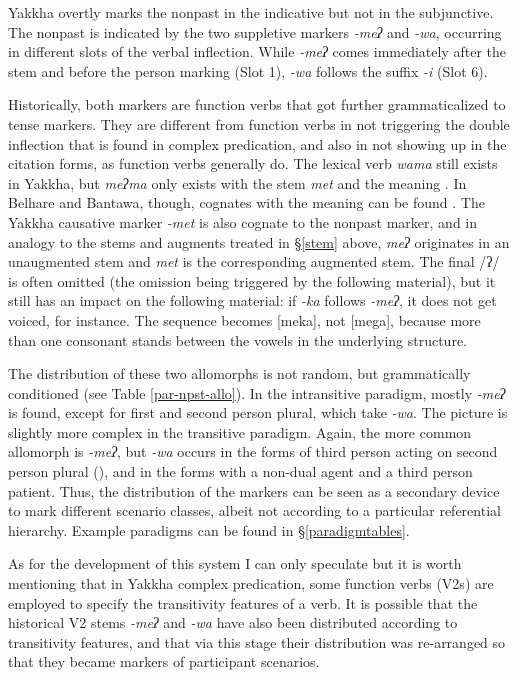 Yakkha overtly marks the nonpast in the indicative but not in the subjunctive. The nonpast is indicated by the two suppletive markers \emph{-meʔ} and \emph{-wa}, occurring in different slots of the verbal inflection. While  \emph{-meʔ} comes immediately after the stem and before the person marking (Slot 1), \emph{-wa} follows the suffix \emph{-i}  (Slot 6). 

Historically, both markers are function verbs that got further grammaticalized to tense markers. They are different from function verbs in not triggering the double inflection that is found in complex predication, and also in not showing up in the citation forms, as function verbs generally do. The lexical verb \emph{wama}  still exists in Yakkha, but \emph{meʔma} only exists with the stem \emph{met} and the meaning . In Belhare and Bantawa, though, cognates with the meaning  can be found  \citep{Bickel1997Dictionary, Doornenbal2009A-grammar}. The Yakkha causative marker \emph{-met} is also cognate to the nonpast marker, and in analogy to the stems and augments treated in §\ref{stem} above,  \emph{meʔ} originates in an unaugmented stem and \emph{met} is the corresponding augmented stem. The final /ʔ/ is often omitted (the omission being triggered by the following material), but it still has an impact on the following material: if \emph{-ka} follows \emph{-meʔ}, it does not get voiced, for instance. The sequence becomes [meka], not [mega], because more than one consonant stands between the vowels  in the underlying structure.


The distribution of these two allomorphs is not random, but grammatically conditioned (see Table \ref{par-npst-allo}). In the intransitive paradigm, mostly \emph{-meʔ} is found, except for first and second person plural, which take \emph{-wa}. The picture is slightly more complex in the transitive paradigm. Again, the more common allomorph is \emph{-meʔ}, but \emph{-wa} occurs in the forms of third person acting on second person plural (), and in the forms with a non-dual agent and a third person patient. Thus, the distribution of the markers can be seen as  a secondary device to mark different scenario classes, albeit not according to a particular referential hierarchy.  Example paradigms can be found in §\ref{paradigmtables}. 

As for the development of this system I can only speculate but it is worth mentioning that in Yakkha complex predication, some function verbs (V2s) are employed to specify the transitivity features of a verb. It is possible that the historical V2 stems \emph{-meʔ} and \emph{-wa} have also been distributed according to transitivity features, and that via this stage their distribution was re-arranged so that they became markers of participant scenarios.


